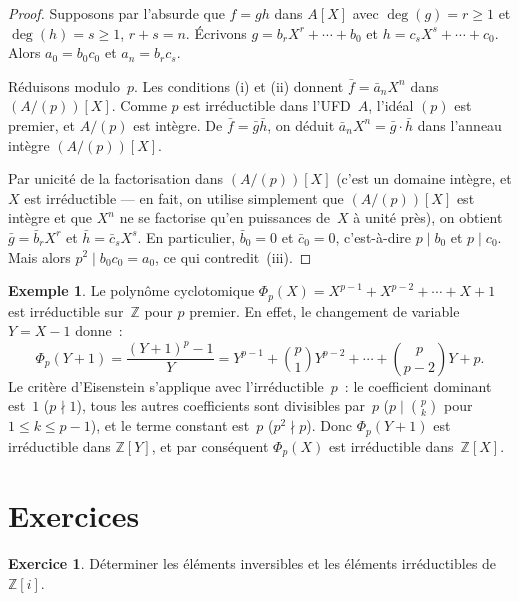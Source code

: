 \documentclass[12pt,a4paper,openany]{book}
\theoremstyle{definition}
\newtheorem{exemple}{Exemple}[chapter]
\newtheorem{exercice}{Exercice}[chapter]
\newcommand{\Z}{\mathbb{Z}}
\begin{document}
\begin{proof}
Supposons par l'absurde que $f = gh$ dans $A[X]$ avec
$\deg(g) = r \geqslant 1$ et $\deg(h) = s \geqslant 1$, $r + s = n$.
Écrivons $g = b_r X^r + \cdots + b_0$ et $h = c_s X^s + \cdots + c_0$.
Alors $a_0 = b_0 c_0$ et $a_n = b_r c_s$.

Réduisons modulo~$p$. Les conditions (i) et (ii) donnent
$\bar{f} = \bar{a}_n X^n$ dans $(A/(p))[X]$. Comme $p$ est irréductible
dans l'UFD~$A$, l'idéal $(p)$ est premier, et $A/(p)$ est intègre. De
$\bar{f} = \bar{g}\bar{h}$, on déduit $\bar{a}_n X^n = \bar{g} \cdot \bar{h}$
dans l'anneau intègre $(A/(p))[X]$.

Par unicité de la factorisation dans $(A/(p))[X]$ (c'est un domaine
intègre, et $X$ est irréductible --- en fait, on utilise simplement que
$(A/(p))[X]$ est intègre et que $X^n$ ne se factorise qu'en puissances
de~$X$ à unité près), on obtient $\bar{g} = \bar{b}_r X^r$ et
$\bar{h} = \bar{c}_s X^s$. En particulier, $\bar{b}_0 = 0$ et
$\bar{c}_0 = 0$, c'est-à-dire $p \mid b_0$ et $p \mid c_0$. Mais alors
$p^2 \mid b_0 c_0 = a_0$, ce qui contredit~(iii).
\end{proof}

\begin{exemple}\label{ex:eisenstein}
Le polynôme cyclotomique $\Phi_p(X) = X^{p-1} + X^{p-2} + \cdots + X + 1$
est irréductible sur~$\Z$ pour $p$ premier. En effet, le changement de
variable $Y = X - 1$ donne~:
\[
  \Phi_p(Y+1) = \frac{(Y+1)^p - 1}{Y}
  = Y^{p-1} + \binom{p}{1}Y^{p-2} + \cdots + \binom{p}{p-2}Y + p.
\]
Le critère d'Eisenstein s'applique avec
l'irréductible~$p$~: le coefficient dominant est~$1$ ($p \nmid 1$),
tous les autres coefficients sont divisibles par~$p$
($p \mid \binom{p}{k}$ pour $1 \leqslant k \leqslant p-1$), et le terme
constant est~$p$ ($p^2 \nmid p$). Donc $\Phi_p(Y+1)$ est irréductible
dans $\Z[Y]$, et par conséquent $\Phi_p(X)$ est irréductible dans~$\Z[X]$.
\end{exemple}

\section{Exercices}\label{sec:exo-factoriels}

\begin{exercice}\label{exo:fact-1}
Déterminer les éléments inversibles et les éléments irréductibles
de~$\Z[i]$.
\end{exercice}
\end{document}
